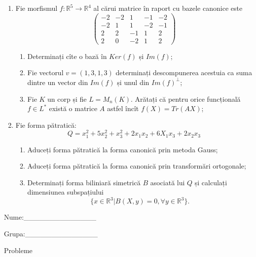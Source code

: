 \documentclass{article}
\begin{document}
\begin{enumerate}
 \item Fie morfismul $f:\mathbb{R}^5 \to \mathbb{R}^4$ al cărui matrice în raport cu bazele canonice este
$$\begin{pmatrix}
-2&-2&1&-1&-2\\
-2&1&1&-2&-1\\
2&2&-1&1&2\\
2&0&-2&1&2
\end{pmatrix}$$

\begin{enumerate}
\item Determinați cîte o bază în $Ker(f)$ și $Im(f)$;
\item Fie vectorul $v=(1,3,1,3)$ determinați descompunerea acestuia ca suma dintre un vector din $Im(f)$ și unul din $Im(f)^\perp$;
\item Fie $K$ un corp și fie $L=M_n(K)$. Arătați că pentru orice funcțională $f \in L^*$ există o matrice $A$ astfel încît $f(X)=Tr(AX)$;
\end{enumerate}
\item Fie forma pătratică:
$$Q= x_1^2+5x_2^2+x_3^2+2x_1x_2+6X_1x_3+2x_2x_3$$

\begin{enumerate}
\item Aduceți forma pătratică la forma canonică prin metoda Gauss;
\item Aduceți forma pătratică la forma canonică prin transformări ortogonale;
\item Determinați forma biliniară simetrică $B$ asociată lui $Q$ și calculați dimensiunea subspațiului
$$\{x \in \mathbb{R}^3 | B(X,y)=0,\forall y \in \mathbb{R}^3\}.$$

\end{enumerate}
\end{enumerate}
\newpage
\begin{flushright}
Nume:\_\_\_\_\_\_\_\_\_\_\_\_\_\_
 
 
Grupa:\_\_\_\_\_\_\_\_\_\_\_\_\_\_
\end{flushright}
\begin{center}
\vspace{2cm}
{\Large Probleme}
\vspace{2cm}
\end{center}
\end{document}
